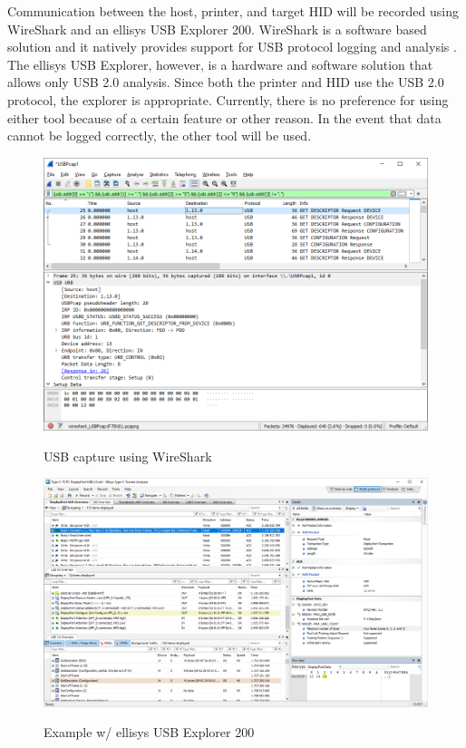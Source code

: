 Communication between the host, printer, and target HID will be recorded using WireShark and an ellisys USB Explorer 200. WireShark is a software based solution and it natively provides support for USB protocol logging and analysis \autocite{CaptureSetupUSBWireshark}. The ellisys USB Explorer, however, is a hardware and software solution that allows only USB 2.0 analysis. Since both the printer and HID use the USB 2.0 protocol, the explorer is appropriate. Currently, there is no preference for using either tool because of a certain feature or other reason. In the event that data cannot be logged correctly, the other tool will be used.


\begin{figure}[!htb]%
    \centering
    {\includegraphics[width=148mm,scale=0.8]{Figures/wireshark_capture.png}}
    \caption{USB capture using WireShark}%
    \label{fig:wireshark_usb}%
\end{figure}

\begin{figure}[!htb]%
    \centering
    {\includegraphics[width=148mm,scale=0.8]{Figures/ellisys_explorer.png}}
    \caption{Example w/ ellisys USB Explorer 200}%
    \label{fig:ellisys_usb}%
\end{figure}

